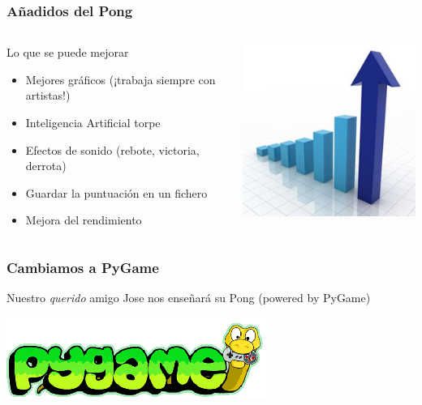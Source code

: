 \begin{frame}
	\frametitle{Añadidos del Pong}
	
    
	\begin{columns}[c]
		\column{200pt}
		
	\begin{block}{Lo que se puede mejorar}
            \begin{itemize}
                \item Mejores gráficos (¡trabaja siempre con artistas!)
                \item Inteligencia Artificial torpe
                \item Efectos de sonido (rebote, victoria, derrota)
                \item Guardar la puntuación en un fichero
		\item Mejora del rendimiento
            \end{itemize}            
        \end{block}        
		
        \column{100pt}
		\begin{center}
			\includegraphics[scale=0.32]{img/expand.jpg}
		\end{center}
        
	\end{columns} 

\end{frame}


\begin{frame}
	\frametitle{Cambiamos a PyGame}
	
	      
	Nuestro \emph{querido} amigo Jose nos enseñará su Pong (powered by PyGame)
	
	\begin{center}
	    \includegraphics[scale=0.32]{img/pygame.png}
	\end{center}

\end{frame}

